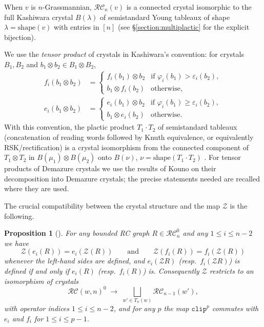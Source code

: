 \documentclass[pdflatex,sn-mathphys-num]{sn-jnl}
\numberwithin{equation}{subsection}
\newcommand{\zeromap}{\mathcal{Z}}
\newcommand{\clp}{\mathtt{clip}}
\newcommand{\RC}{\mathcal{RC}}
\theoremstyle{thmstyleone}
\newtheorem{proposition}[lemma]{Proposition}
\theoremstyle{thmstylethree}
\theoremstyle{thmstyletwo}
\begin{document}
When $v$ is $n$-Grassmannian, $\RC_n(v)$ is a connected crystal isomorphic to the full Kashiwara crystal $B(\lambda)$ of semistandard Young tableaux of shape $\lambda=\mathrm{shape}(v)$ with entries in $[n]$ (see \S\ref{section:multiplactic} for the explicit bijection).

We use the \emph{tensor product} of crystals in Kashiwara's convention: for crystals $B_1,B_2$ and $b_1\otimes b_2\in B_1\otimes B_2$,
\begin{equation}\label{eq:tensorrule}
\begin{aligned}
f_i(b_1\otimes b_2) &= \begin{cases} f_i(b_1)\otimes b_2 & \text{if }\varphi_i(b_1)>\varepsilon_i(b_2),\\ b_1\otimes f_i(b_2) & \text{otherwise,}\end{cases}\\
e_i(b_1\otimes b_2) &= \begin{cases} e_i(b_1)\otimes b_2 & \text{if }\varphi_i(b_1)\geq\varepsilon_i(b_2),\\ b_1\otimes e_i(b_2) & \text{otherwise.}\end{cases}
\end{aligned}
\end{equation}
With this convention, the plactic product $T_1\cdot T_2$ of semistandard tableaux (concatenation of reading words followed by Knuth equivalence, or equivalently RSK/rectification) is a crystal isomorphism from the connected component of $T_1\otimes T_2$ in $B(\mu_1)\otimes B(\mu_2)$ onto $B(\nu)$, $\nu=\mathrm{shape}(T_1\cdot T_2)$ \cite{kashiwara1993crystal,littelmann1995crystal}. For tensor products of Demazure crystals we use the results of Kouno \cite{kouno2020decomposition} on their decomposition into Demazure crystals; the precise statements needed are recalled where they are used.

The crucial compatibility between the crystal structure and the map $\zeromap$ is the following.

\begin{proposition}[{\cite[Corollary~\ref*{B-corollary:crystaliso}]{samuelbialgebra}}] \label{proposition:zerocrystal}
For any bounded RC graph $R\in\RC_n^0$ and any $1\leq i\leq n-2$ we have
$$\zeromap(e_i(R)) = e_i(\zeromap(R))\qquad\text{and}\qquad \zeromap(f_i(R)) = f_i(\zeromap(R))$$
whenever the left-hand sides are defined, and $e_i(\zeromap R)$ (resp.\ $f_i(\zeromap R)$) is defined if and only if $e_i(R)$ (resp.\ $f_i(R)$) is. Consequently $\zeromap$ restricts to an isomorphism of crystals
$$\RC(w,n)^0\;\longrightarrow\;\bigsqcup_{w'\in T_n(w)}\RC_{n-1}(w'),$$
with operator indices $1\leq i\leq n-2$, and for any $p$ the map $\clp^p$ commutes with $e_i$ and $f_i$ for $1\leq i\leq p-1$.
\end{proposition}
\end{document}
